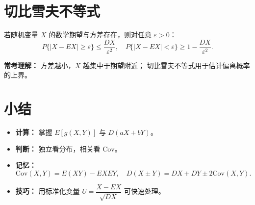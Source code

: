 \section{切比雪夫不等式}
若随机变量 $X$ 的数学期望与方差存在，则对任意 $\varepsilon>0$：
$$
      P\{|X-EX|\ge\varepsilon\}\le\frac{DX}{\varepsilon^2},\quad
      P\{|X-EX|<\varepsilon\}\ge1-\frac{DX}{\varepsilon^2}.
$$

\textbf{常考理解：}
方差越小，$X$ 越集中于期望附近；
切比雪夫不等式用于估计偏离概率的上界。


\section*{小结}
\begin{itemize}
      \item \textbf{计算：} 掌握 $E[g(X,Y)]$ 与 $D(aX+bY)$。
      \item \textbf{判断：} 独立看分布，相关看 $\mathrm{Cov}$。
      \item \textbf{记忆：}
            $$\mathrm{Cov}(X,Y)=E(XY)-EXEY,\quad D(X\pm Y)=DX+DY\pm2\mathrm{Cov}(X,Y).$$
      \item \textbf{技巧：} 用标准化变量 $U=\dfrac{X-EX}{\sqrt{DX}}$ 可快速处理。
\end{itemize}